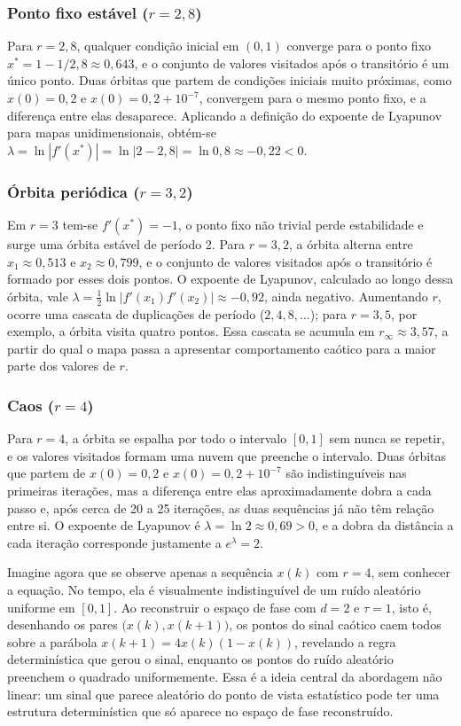 \documentclass[]{article}
\begin{document}
	\subsubsection{Ponto fixo estável ($r = 2{,}8$)}
	\noindent
	Para $r = 2{,}8$, qualquer condição inicial em $(0, 1)$ converge para o ponto fixo $x^* = 1 - 1/2{,}8 \approx 0{,}643$, e o conjunto de valores visitados após o transitório é um único ponto. Duas órbitas que partem de condições iniciais muito próximas, como $x(0) = 0{,}2$ e $x(0) = 0{,}2 + 10^{-7}$, convergem para o mesmo ponto fixo, e a diferença entre elas desaparece. Aplicando a definição do expoente de Lyapunov para mapas unidimensionais, obtém-se $\lambda = \ln|f'(x^*)| = \ln|2 - 2{,}8| = \ln 0{,}8 \approx -0{,}22 < 0$.

	\subsubsection{Órbita periódica ($r = 3{,}2$)}
	\noindent
	Em $r = 3$ tem-se $f'(x^*) = -1$, o ponto fixo não trivial perde estabilidade e surge uma órbita estável de período 2. Para $r = 3{,}2$, a órbita alterna entre $x_1 \approx 0{,}513$ e $x_2 \approx 0{,}799$, e o conjunto de valores visitados após o transitório é formado por esses dois pontos. O expoente de Lyapunov, calculado ao longo dessa órbita, vale $\lambda = \frac{1}{2}\ln\big|f'(x_1) f'(x_2)\big| \approx -0{,}92$, ainda negativo. Aumentando $r$, ocorre uma cascata de duplicações de período ($2, 4, 8, \dots$); para $r = 3{,}5$, por exemplo, a órbita visita quatro pontos. Essa cascata se acumula em $r_\infty \approx 3{,}57$, a partir do qual o mapa passa a apresentar comportamento caótico para a maior parte dos valores de $r$.

	\subsubsection{Caos ($r = 4$)}
	\noindent
	Para $r = 4$, a órbita se espalha por todo o intervalo $[0, 1]$ sem nunca se repetir, e os valores visitados formam uma nuvem que preenche o intervalo. Duas órbitas que partem de $x(0) = 0{,}2$ e $x(0) = 0{,}2 + 10^{-7}$ são indistinguíveis nas primeiras iterações, mas a diferença entre elas aproximadamente dobra a cada passo e, após cerca de 20 a 25 iterações, as duas sequências já não têm relação entre si. O expoente de Lyapunov é $\lambda = \ln 2 \approx 0{,}69 > 0$, e a dobra da distância a cada iteração corresponde justamente a $e^{\lambda} = 2$.

	Imagine agora que se observe apenas a sequência $x(k)$ com $r = 4$, sem conhecer a equação. No tempo, ela é visualmente indistinguível de um ruído aleatório uniforme em $[0, 1]$. Ao reconstruir o espaço de fase com $d = 2$ e $\tau = 1$, isto é, desenhando os pares $\big(x(k), x(k+1)\big)$, os pontos do sinal caótico caem todos sobre a parábola $x(k+1) = 4x(k)(1 - x(k))$, revelando a regra determinística que gerou o sinal, enquanto os pontos do ruído aleatório preenchem o quadrado uniformemente. Essa é a ideia central da abordagem não linear: um sinal que parece aleatório do ponto de vista estatístico pode ter uma estrutura determinística que só aparece no espaço de fase reconstruído.
\end{document}
